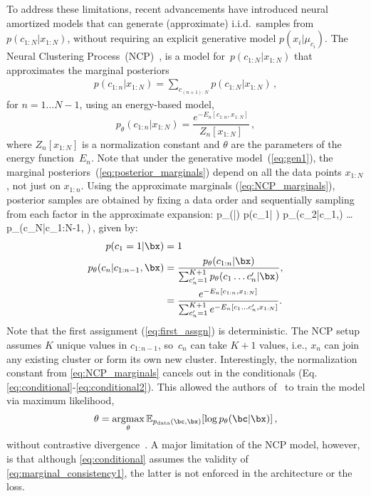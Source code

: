To address these limitations, recent advancements have introduced neural amortized models that can generate (approximate)
i.i.d.~samples from $p(c_{1:N}|x_{1:N})$, 
without requiring an explicit generative model $p(x_i|\mu_{c_i})$. 
The Neural Clustering Process~(NCP)~\citep{pakman2020},
is a model for~$p(c_{1:N}|x_{1:N})$
that approximates the marginal posteriors \begin{align}
p(c_{1:n}| x_{1:N}  )=
\!\!\! \sum_{c_{(n+1):N}} 
\!\!\! 
p(c_{1:N}| x_{1:N} ) \,,
 \label{eq:posterior_marginals}
\end{align} 
for $n=1 \ldots N-1$, 
using an energy-based model,
\begin{equation}
p_{\theta}(c_{1:n}| x_{1:N}  ) = 
  \frac{e^{-E_n[c_{1:n}, x_{1:N}]}}{Z_n[x_{1:N}]} \,,
\label{eq:NCP_marginals}
\end{equation}
where $Z_n[x_{1:N}]$ is a normalization constant
and $\theta$ are the parameters of the energy 
function~$E_n$. Note that under the  generative model~(\autoref{eq:gen1}),
the marginal posteriors~(\autoref{eq:posterior_marginals})
depend on all the  data points   $x_{1:N}$, 
not just on $x_{1:n}$.
Using the approximate marginals (\autoref{eq:NCP_marginals}),
posterior samples are obtained by fixing a data order and  sequentially sampling from  each factor in the approximate expansion:
\eqan 
p_{\theta}(\bc |\bx) 
\simeq   p(c_1| \bx ) p_{\theta}(c_2|c_1,\bx ) \ldots p_{\theta}(c_N|c_{1:N-1}, \bx)\,,
\label{joint}
\enan
given by:  
\begin{align}
p(c_1=1| \bx ) &= 1
\label{eq:first_assgn}
\\
p_{\theta}(c_n|c_{1:n-1}, \bx) 
&= \frac{  p_{\theta}(c_{1:n} |\bx)}
{  \sum_{c_n'=1}^{K+1}  p_{\theta}(c_1 \ldots c_n'| \bx)},
\label{eq:conditional}
\\
&= \frac{  e^{-E_n[c_{1:n}, x_{1:N}]} }
{  \sum_{c_n'=1}^{K+1}  
e^{-E_n[c_1 \ldots c_n', x_{1:N}]}}.
\label{eq:conditional2}
\end{align}
Note that the first assignment (\autoref{eq:first_assgn}) is deterministic. The NCP setup assumes $K$ unique values in $c_{1:n-1}$,
so~$c_n$ can take $K+1$ values, i.e., $x_n$ can join any existing cluster or form its own new cluster. 
%
Interestingly, the normalization constant from \autoref{eq:NCP_marginals} cancels out in the conditionals (Eq. \ref{eq:conditional}-\ref{eq:conditional2}). This allowed the authors of~\cite{pakman2020} to train the model via maximum likelihood,  
\begin{align}
    \theta = \argmax_{\theta} \mathbb{E}_{ p_{\text{data}}(\bc, \bx)} [\log p_{\theta}(\bc |\bx) ]    \,,
\end{align}
without contrastive divergence~\citep{hinton2002training}. 
A major limitation of the NCP model, however, is that 
although \autoref{eq:conditional} assumes 
the validity of \autoref{eq:marginal_consistency1}, the latter is not enforced 
in the architecture or the loss. 

